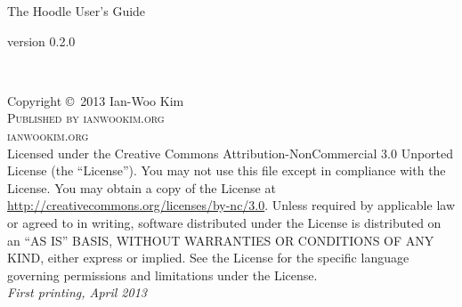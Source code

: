 \documentclass[11pt,fleqn]{book} %
\begin{document}
\setcounter{page}{1}

\begingroup
\thispagestyle{empty}
\centering
\vspace*{9cm}
\par\normalfont\fontsize{35}{35}\sffamily\selectfont
The Hoodle User's Guide\par %
\vspace*{1cm}
{\Huge version 0.2.0}\par %
\endgroup


\newpage
~\vfill
\thispagestyle{empty}

\noindent Copyright \copyright\ 2013 Ian-Woo Kim\\ %

\noindent \textsc{Published by ianwookim.org}\\ %

\noindent \textsc{ianwookim.org}\\ %

\noindent Licensed under the Creative Commons Attribution-NonCommercial 3.0 Unported License (the ``License''). You may not use this file except in compliance with the License. You may obtain a copy of the License at \url{http://creativecommons.org/licenses/by-nc/3.0}. Unless required by applicable law or agreed to in writing, software distributed under the License is distributed on an \textsc{``AS IS'' BASIS, WITHOUT WARRANTIES OR CONDITIONS OF ANY KIND}, either express or implied. See the License for the specific language governing permissions and limitations under the License.\\ %

\noindent \textit{First printing, April 2013} %

\end{document}
